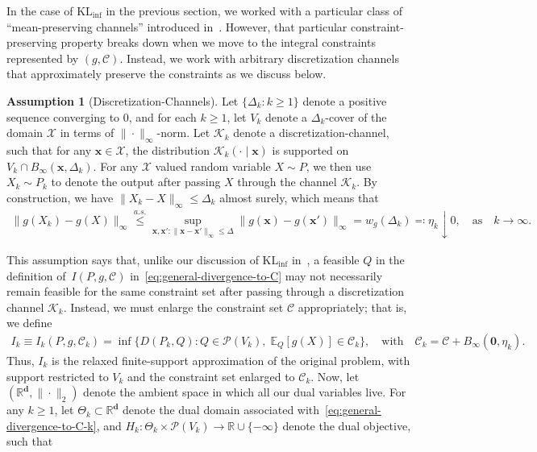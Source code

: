 \documentclass{article}
\theoremstyle{plain}
\theoremstyle{definition}
\newtheorem{assumption}[assumption]{Assumption}
\newcommand{\KLinf}{\operatorname{KL_{inf}}}
\newcommand{\R}{\mathbb{R}}
\newcommand{\calP}{\mathcal P}
\newcommand{\calC}{\mathcal C}
\newcommand{\calX}{\mathcal X}
\newcommand{\calK}{\mathcal{K}}
\newcommand{\dvec}{\mathbf{d}}
\newcommand{\xvec}{\mathbf{x}}
\newcommand{\qtext}[1]{\quad \text{#1} \quad}
\begin{document}
In the case of $\KLinf$ in the previous section, we worked with a particular class of ``mean-preserving channels'' introduced in~. However, that particular constraint-preserving property breaks down when we move to the integral constraints represented by $(g,\calC)$. Instead, we work with arbitrary discretization channels that approximately preserve the constraints as we discuss below. 
\begin{assumption}[Discretization-Channels]
    \label{assump:general-discretization} Let $\{\Delta_k: k \geq 1\}$ denote a positive sequence converging to $0$, and for each $k \geq 1$, let $V_k$ denote a $\Delta_k$-cover of the domain $\calX$ in terms of $\|\cdot\|_\infty$-norm. Let $\calK_k$ denote a discretization-channel, such that for any $\xvec \in \calX$, the distribution $\calK_k(\cdot \mid \xvec)$ is supported on $V_k \cap B_\infty(\xvec, \Delta_k)$. 
    For any $\calX$ valued random variable $X \sim P$, we then use $X_k \sim P_k$ to denote the output after passing $X$ through the channel $\calK_k$. 
    By construction, we have $\|X_k - X\|_\infty \leq \Delta_k$ almost surely, which means that 
    \begin{align}
        \|g(X_k) - g(X)\|_\infty \stackrel{a.s.}{\leq} \sup_{\xvec, \xvec': \|\xvec-\xvec'\|_\infty \leq \Delta} \|g(\xvec) - g(\xvec')\|_\infty = w_g(\Delta_k) \eqcolon \eta_k \downarrow 0, \qtext{as} k \to \infty. 
    \end{align}
\end{assumption}
This assumption says that, unlike our discussion of $\KLinf$ in~, a feasible $Q$ in the definition of~$I(P, g, \calC)$ in~\eqref{eq:general-divergence-to-C} may not necessarily remain feasible for the same constraint set after passing through a discretization channel $\calK_k$. Instead, we must enlarge the constraint set $\calC$ appropriately; that is, we define 
\begin{align}
    I_k \equiv I_k(P, g, \calC_k) = \inf \{D(P_k, Q): Q \in \calP(V_k), \; \mathbb{E}_Q[g(X)] \in \calC_k\}, \qtext{with} \calC_k = \calC + B_\infty(\boldsymbol{0}, \eta_k). \label{eq:general-divergence-to-C-k}
\end{align}
Thus, $I_k$ is the relaxed finite-support approximation of the original problem, with support restricted to $V_k$ and the constraint set enlarged to $\calC_k$. 
Now, let $(\R^{\dvec}, \|\cdot\|_2)$ denote the ambient space in which all our dual variables live. For any $k \geq 1$, let $\Theta_k \subset \R^{\dvec}$ denote the dual domain associated with~\eqref{eq:general-divergence-to-C-k}, and $H_k: \Theta_k \times \calP(V_k) \to \R \cup \{-\infty\}$ denote the dual objective, such that 
\end{document}
